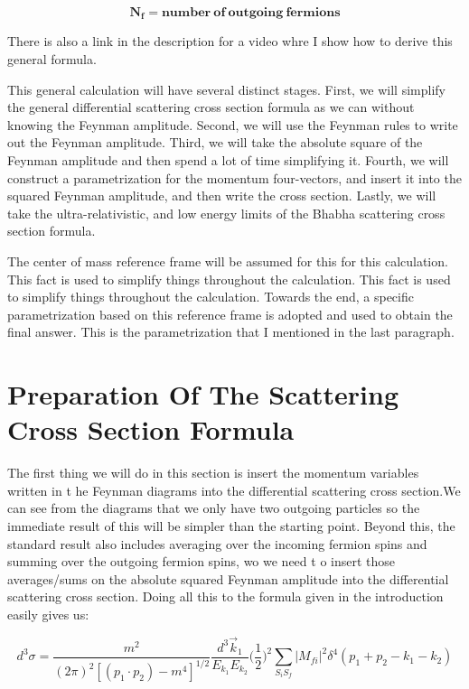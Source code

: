 \documentclass[a4]{article}
\begin{document}
    \[
        \mathbf{N_f = number \: of \: outgoing \: fermions}
    \]

    There is also a link in the description for a video whre I show how to derive this general formula.

    This general calculation will have several distinct stages. First, we will simplify the general differential scattering cross section formula as we can without knowing the Feynman amplitude.
    Second, we will use the Feynman rules to write out the Feynman amplitude. Third, we will take the absolute square of the Feynman amplitude and then spend a lot of time simplifying it. Fourth,
    we will construct a parametrization for the momentum four-vectors, and insert it into the squared Feynman amplitude, and then write the cross section. Lastly, we will take the ultra-relativistic,
    and low energy limits of the Bhabha scattering cross section formula.

    The center of mass reference frame will be assumed for this for this calculation. This fact is used to simplify things throughout the calculation. This fact is used to simplify things throughout
    the calculation. Towards the end, a specific parametrization based on this reference frame is adopted and used to obtain the final answer. This is the parametrization that I mentioned in the last
    paragraph.

    \section*{Preparation Of The Scattering Cross Section Formula}

    The first thing we will do in this section is insert the momentum variables written in t he Feynman diagrams into the differential scattering cross section.We can see from the diagrams that we only
    have two outgoing particles so the immediate result of this will be simpler than the starting point. Beyond this, the standard result also includes averaging over the incoming fermion spins and
    summing over the outgoing fermion spins, wo we need t o insert those averages/sums on the absolute squared Feynman amplitude into the differential scattering cross section. Doing all this to the
    formula given in the introduction easily gives us:

    \begin{equation}
        d^3 \sigma = \frac{m^2}{(2 \pi)^2 [(p_1 \cdot p_2) - m^4]^{1/2}} \frac{d^3 \vec{k}_1}{E_{k_1} E_{k_2}} \bigg( \frac{1}{2} \bigg)^2 \sum_{S_i S_f} |M_{fi}|^2 \delta^4 (p_1 + p_2 - k_1 - k_2)
    \end{equation}
\end{document}
